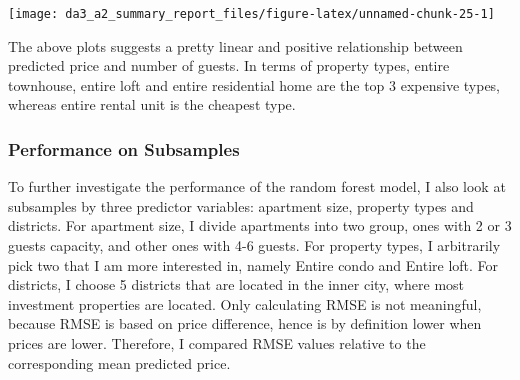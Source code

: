 \documentclass[
]{article}
\begin{document}
\begin{center}\texttt{[image: da3\_a2\_summary\_report\_files/figure-latex/unnamed-chunk-25-1]} \end{center}

The above plots suggests a pretty linear and positive relationship
between predicted price and number of guests. In terms of property
types, entire townhouse, entire loft and entire residential home are the
top 3 expensive types, whereas entire rental unit is the cheapest type.

\hypertarget{performance-on-subsamples}{%
\subsubsection{Performance on
Subsamples}\label{performance-on-subsamples}}

To further investigate the performance of the random forest model, I
also look at subsamples by three predictor variables: apartment size,
property types and districts. For apartment size, I divide apartments
into two group, ones with 2 or 3 guests capacity, and other ones with
4-6 guests. For property types, I arbitrarily pick two that I am more
interested in, namely Entire condo and Entire loft. For districts, I
choose 5 districts that are located in the inner city, where most
investment properties are located. Only calculating RMSE is not
meaningful, because RMSE is based on price difference, hence is by
definition lower when prices are lower. Therefore, I compared RMSE
values relative to the corresponding mean predicted price.

\begin{table}[!h]
\centering
{}
\end{table}
\end{document}
